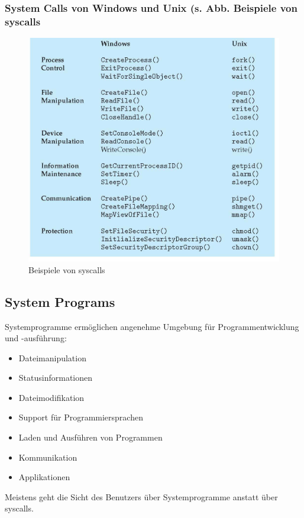 \documentclass[a4paper]{scrreprt}
\begin{document}
\subsubsection{System Calls von Windows und Unix (s. Abb. Beispiele von syscalls}
\begin{figure}[ht]
\centering
\includegraphics[scale=0.3]{graphics/syscall_examples.png}
\caption{Beispiele von syscalls}
\end{figure}

\subsection{System Programs}
Systemprogramme ermöglichen angenehme Umgebung für Programmentwicklung und -ausführung:
\begin{itemize}
	\item Dateimanipulation
	\item Statusinformationen
	\item Dateimodifikation
	\item Support für Programmiersprachen
	\item Laden und Ausführen von Programmen
	\item Kommunikation
	\item Applikationen
\end{itemize}
Meistens geht die Sicht des Benutzers über Systemprogramme anstatt über syscalls.
\end{document}
